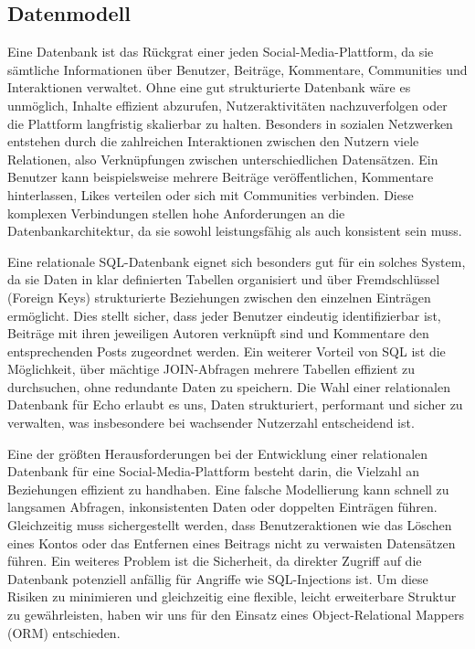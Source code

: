 \documentclass[a4paper,12pt]{article}
\begin{document}
\subsection{Datenmodell}
Eine Datenbank ist das Rückgrat einer jeden
Social-Media-Plattform, da sie sämtliche Informationen über Benutzer, Beiträge,
Kommentare, Communities und Interaktionen verwaltet. Ohne eine gut
strukturierte Datenbank wäre es unmöglich, Inhalte effizient abzurufen,
Nutzeraktivitäten nachzuverfolgen oder die Plattform langfristig skalierbar zu
halten. Besonders in sozialen Netzwerken entstehen durch die zahlreichen
Interaktionen zwischen den Nutzern viele Relationen, also Verknüpfungen
zwischen unterschiedlichen Datensätzen. Ein Benutzer kann beispielsweise
mehrere Beiträge veröffentlichen, Kommentare hinterlassen, Likes verteilen oder
sich mit Communities verbinden. Diese komplexen Verbindungen stellen hohe
Anforderungen an die Datenbankarchitektur, da sie sowohl leistungsfähig als
auch konsistent sein muss.

Eine relationale SQL-Datenbank eignet sich besonders gut für ein solches
System, da sie Daten in klar definierten Tabellen organisiert und über
Fremdschlüssel (Foreign Keys) strukturierte Beziehungen zwischen den einzelnen
Einträgen ermöglicht. Dies stellt sicher, dass jeder Benutzer eindeutig
identifizierbar ist, Beiträge mit ihren jeweiligen Autoren verknüpft sind und
Kommentare den entsprechenden Posts zugeordnet werden. Ein weiterer Vorteil von
SQL ist die Möglichkeit, über mächtige JOIN-Abfragen mehrere Tabellen effizient
zu durchsuchen, ohne redundante Daten zu speichern. Die Wahl einer relationalen
Datenbank für Echo erlaubt es uns, Daten strukturiert, performant und sicher zu
verwalten, was insbesondere bei wachsender Nutzerzahl entscheidend ist.

Eine der größten Herausforderungen bei der Entwicklung einer relationalen
Datenbank für eine Social-Media-Plattform besteht darin, die Vielzahl an
Beziehungen effizient zu handhaben. Eine falsche Modellierung kann schnell zu
langsamen Abfragen, inkonsistenten Daten oder doppelten Einträgen führen.
Gleichzeitig muss sichergestellt werden, dass Benutzeraktionen wie das Löschen
eines Kontos oder das Entfernen eines Beitrags nicht zu verwaisten Datensätzen
führen. Ein weiteres Problem ist die Sicherheit, da direkter Zugriff auf die
Datenbank potenziell anfällig für Angriffe wie SQL-Injections ist. Um diese
Risiken zu minimieren und gleichzeitig eine flexible, leicht erweiterbare
Struktur zu gewährleisten, haben wir uns für den Einsatz eines
Object-Relational Mappers (ORM) entschieden.
\end{document}
